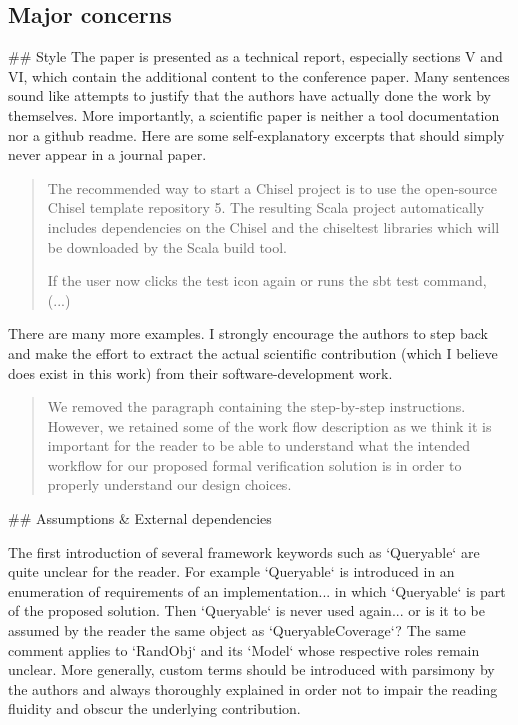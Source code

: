\documentclass{article}
\newcommand{\martin}[1]{{\color{blue} Martin: #1\\}}
\newcommand{\reply}[1]{{\color{blue} #1}}
\begin{document}
\subsection*{Major concerns}
\#\# Style
The paper is presented as a technical report, especially sections V and VI, which contain the additional content to the conference paper.
Many sentences sound like attempts to justify that the authors have actually done the work by themselves. 
More importantly, a scientific paper is neither a tool documentation nor a github readme.
Here are some self-explanatory excerpts that should simply never appear in a journal paper.


\begin{quote}
The recommended way to
start a Chisel project is to use the open-source Chisel template
repository 5. The resulting Scala project automatically includes
dependencies on the Chisel and the chiseltest libraries which
will be downloaded by the Scala build tool.

If the user now clicks the test icon again
or runs the sbt test command, (...)
\end{quote}


There are many more examples. 
I strongly encourage the authors to step back and make the effort to extract the actual scientific contribution (which I believe does exist in this work) from their software-development work.

\begin{quote}
\reply{
We removed the paragraph containing the step-by-step instructions. However, we retained some of the work flow description as we think it is important for the reader to be able to understand what
the intended workflow for our proposed formal verification solution is in order to properly understand our design choices.
}
\end{quote}


\#\# Assumptions \& External dependencies

The first introduction of several framework keywords such as `Queryable` are quite unclear for the reader.
For example `Queryable` is introduced in an enumeration of requirements of an implementation... in which `Queryable` is part of the proposed solution.
Then `Queryable` is never used again... or is it to be assumed by the reader the same object as `QueryableCoverage`?
The same comment applies to `RandObj` and its `Model` whose respective roles remain unclear.
More generally, custom terms should be introduced with parsimony by the authors and always thoroughly explained in order not to impair the reading fluidity and obscur the underlying contribution.
\end{document}
